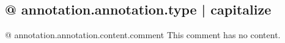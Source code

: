 \subsection{{@ annotation.annotation.type | capitalize }}

{@ annotation.annotation.content.comment }
This comment has no content.
